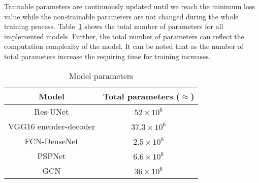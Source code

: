 Trainable parameters are continuously updated until we reach the minimum loss value while the non-trainable parameters are not changed during the whole training process.
Table~\ref{tab:table_parameters} shows the total number of parameters for all implemented models.
Further, the total number of parameters can reflect the computation complexity of the model.
It can be noted that as the number of total parameters increase the requiring time for training increases.
\begin{table}[]
	\centering
	\caption{Model parameters}
	\label{tab:table_parameters}
		\begin{tabular}{cc}\hline
			Model &  Total parameters (\(\approx\)) \\ \hline
			Res-UNet & \(52\times 10^6\) \\ 
			VGG16 encoder-decoder & \(37.3\times 10^6\)  \\
			FCN-DenseNet & \(2.5\times 10^6\) \\ 
			PSPNet & \(6.6\times 10^6\) \\ 
			GCN & \(36\times 10^6\) \\ \hline
		\end{tabular}
\end{table}
